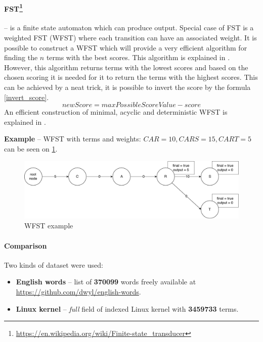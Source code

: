 \paragraph{FST\protect\footnote{\url{https://en.wikipedia.org/wiki/Finite-state\_transducer}}} \label{FST} – is a finite state
automaton which can produce output. Special case of FST is a weighted FST (WFST) where each transition can have an
associated weight. It is possible to construct a WFST which will provide a very efficient algorithm for finding the
$n$ terms with the best scores. This algorithm is explained in \citep{Mohri02anefficient}. However, this algorithm returns
terms with the lowest scores and based on the chosen scoring it is needed for it to return the terms with the highest
scores. This can be achieved by a neat trick, it is possible to invert the score by the formula \ref{invert_score}.
\begin{equation}
\label{invert_score}
newScore = maxPossibleScoreValue - score
\end{equation}
An efficient construction of minimal, acyclic and deterministic WFST is explained in \citep{Mihov01directconstruction}.

\textbf{Example} – WFST with terms and weights: $CAR = 10, CARS = 15, CART = 5$ can be seen on \ref{wfst_example}.

\begin{figure}[htbp]
\centering
\includegraphics[width=145mm]{../img/wfst.pdf}
\caption{WFST example}
\label{wfst_example}
\end{figure}


\paragraph{Comparison}

Two kinds of dataset were used:
\begin{itemize}
    \item \textbf{English words} – list of \textbf{370099} words freely available at \url{https://github.com/dwyl/english-words}.
    \item \textbf{Linux kernel} – \textit{full} field of indexed Linux kernel with \textbf{3459733} terms.
\end{itemize}

